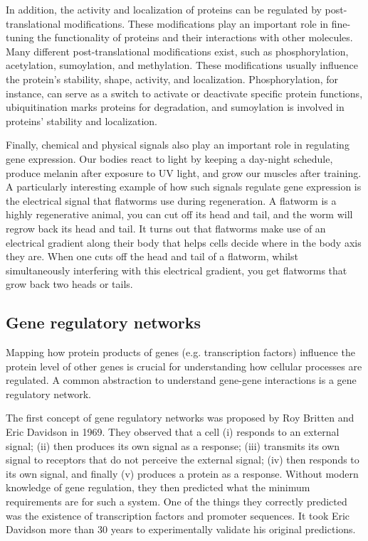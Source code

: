 In addition, the activity and localization of proteins can be regulated by post-translational modifications\cite{Ramazi2021}. These modifications play an important role in fine-tuning the functionality of proteins and their interactions with other molecules. Many different post-translational modifications exist, such as phosphorylation, acetylation, sumoylation, and methylation. These modifications usually influence the protein's stability, shape, activity, and localization. Phosphorylation, for instance, can serve as a switch to activate or deactivate specific protein functions\cite{Cohen2002}, ubiquitination marks proteins for degradation, and sumoylation is involved in proteins' stability and localization\cite{Mazur2012}.

Finally, chemical and physical signals also play an important role in regulating gene expression. Our bodies react to light by keeping a day-night schedule, produce melanin after exposure to UV light, and grow our muscles after training. A particularly interesting example of how such signals regulate gene expression is the electrical signal that flatworms use during regeneration. A flatworm is a highly regenerative animal, you can cut off its head and tail, and the worm will regrow back its head and tail. It turns out that flatworms make use of an electrical gradient along their body that helps cells decide where in the body axis they are. When one cuts off the head and tail of a flatworm, whilst simultaneously interfering with this electrical gradient, you get flatworms that grow back two heads or tails\cite{Levin2014}.

\subsection{Gene regulatory networks}

Mapping how protein products of genes (e.g. transcription factors) influence the protein level of other genes is crucial for understanding how cellular processes are regulated. A common abstraction to understand gene-gene interactions is a gene regulatory network.

The first concept of gene regulatory networks was proposed by Roy Britten and Eric Davidson in 1969\cite{Britten_1969}. They observed that a cell (i) responds to an external signal; (ii) then produces its own signal as a response; (iii) transmits its own signal to receptors that do not perceive the external signal; (iv) then responds to its own signal, and finally (v) produces a protein as a response. Without modern knowledge of gene regulation, they then predicted what the minimum requirements are for such a system. One of the things they correctly predicted was the existence of transcription factors and promoter sequences. It took Eric Davidson more than 30 years to experimentally validate his original predictions\cite{Davidson_2002}.

